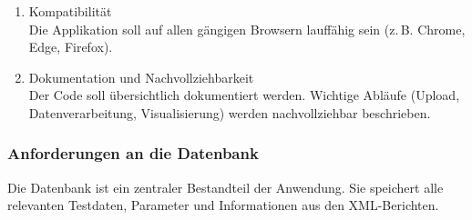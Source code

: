 \begin{enumerate}
  \item Kompatibilität \\
  Die Applikation soll auf allen gängigen Browsern lauffähig sein (z.\,B. Chrome, Edge, Firefox).

  \item Dokumentation und Nachvollziehbarkeit \\
  Der Code soll übersichtlich dokumentiert werden.
  Wichtige Abläufe (Upload, Datenverarbeitung, Visualisierung) werden nachvollziehbar beschrieben.
\end{enumerate}

\subsubsection{Anforderungen an die Datenbank}
\label{subsec:anforderungen-an-die-datenbank}

Die Datenbank ist ein zentraler Bestandteil der Anwendung.
Sie speichert alle relevanten Testdaten, Parameter und Informationen aus den XML-Berichten.

